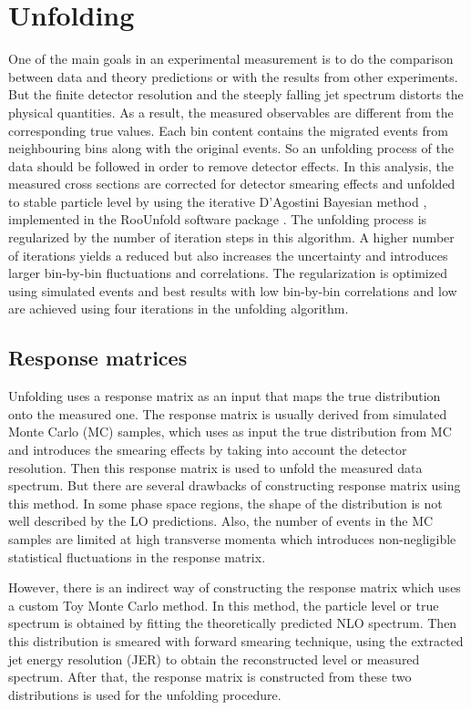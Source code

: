 \section{Unfolding}
\label{sec:unfolding}
One of the main goals in an experimental measurement is to do the comparison between data and theory predictions or with the results from other experiments. But the finite detector resolution and the steeply falling jet \pt spectrum distorts the physical quantities. As a result, the measured observables are different from the corresponding true values. Each \pt bin content contains the migrated events from neighbouring bins along with the original events. So an unfolding process of the data should be followed in order to remove detector effects. In this analysis, the measured cross sections are corrected for detector smearing effects and unfolded to stable particle level by using the iterative D'Agostini Bayesian method \cite{DAgostini:1994fjx}, implemented in the RooUnfold software package \cite{Adye:2011gm}. The unfolding process is regularized by the number of iteration steps in this algorithm. A higher number of iterations yields a reduced \chisq but also increases the uncertainty and introduces larger bin-by-bin fluctuations and correlations. The regularization is optimized using simulated events and best results with low bin-by-bin correlations and low \chisq are achieved using four iterations in the unfolding algorithm.

\subsection{Response matrices}
\label{sec:funcs}

Unfolding uses a response matrix as an input that maps the true distribution onto the measured one. The response matrix is usually derived from simulated Monte Carlo (MC) samples, which uses as input the true distribution from MC and introduces the smearing effects by taking into account the detector resolution. Then this response matrix is used to unfold the measured data spectrum. But there are several drawbacks of constructing response matrix using this method. In some phase space regions, the shape of the distribution is not well described by the LO predictions. Also, the number of events in the MC samples are limited at high transverse momenta which introduces non-negligible statistical fluctuations in the response matrix. 

However, there is an indirect way of constructing the response matrix which uses a custom Toy Monte Carlo method. In this method, the particle level or true \httwo spectrum is obtained by fitting the theoretically predicted NLO spectrum. Then this distribution is smeared with forward smearing technique, using the extracted jet energy resolution (JER) to obtain the reconstructed level or measured \httwo spectrum. After that, the response matrix is constructed from these two distributions is used for the unfolding procedure. 

